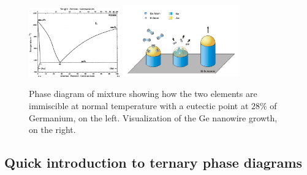 \begin{figure}[t]
    \centering
    \includegraphics[width=0.35\textwidth]{Immagini/Ge-Au.png}
    \includegraphics[width=0.45\textwidth]{Immagini/NanoGrowth.png}
    \caption
    {
        Phase diagram of  mixture showing how the two elements are immiscible at normal temperature with a eutectic point at $28\%$ of Germanium, on the left. Visualization of the Ge nanowire growth, on the right.
    }
    \label{fig:Ge-Au}
\end{figure}

\subsection{Quick introduction to ternary phase diagrams}

